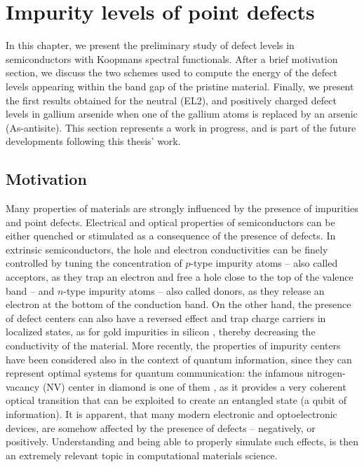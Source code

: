 \cleardoublepage
\chapter{Impurity levels of point defects\label{ch:defects}}
In this chapter, we present the preliminary study of defect levels in semiconductors with Koopmans spectral functionals. After a brief motivation section, we discuss the two schemes used to compute the energy of the defect levels appearing within the band gap of the pristine material. Finally, we present the first results obtained for the neutral (EL2), and positively charged defect levels in gallium arsenide when one of the gallium atoms is replaced by an arsenic (As-antisite). This section represents a work in progress, and is part of the future developments following this thesis' work.

\clearpage
\section{Motivation\label{sec:motivation-defects}}
Many properties of materials are strongly influenced by the presence of impurities and point defects. Electrical and optical properties of semiconductors can be either quenched or stimulated as a consequence of the presence of defects. In extrinsic semiconductors, the hole and electron conductivities can be finely controlled by tuning the concentration of $p$-type impurity atoms -- also called acceptors, as they trap an electron and free a hole close to the top of the valence band -- and $n$-type impurity atoms -- also called donors, as they release an electron at the bottom of the conduction band. On the other hand, the presence of defect centers can also have a reversed effect and trap charge carriers in localized states, as for gold impurities in silicon \cite{corsetti_negative-u_2014}, thereby decreasing the conductivity of the material. More recently, the properties of impurity centers have been considered also in the context of quantum information, since they can represent optimal systems for quantum communication: the infamous nitrogen-vacancy (NV) center in diamond is one of them \cite{maze_properties_2011}, as it provides a very coherent optical transition that can be exploited to create an entangled state (a qubit of information). It is apparent, that many modern electronic and optoelectronic devices, are somehow affected by the presence of defects -- negatively, or positively. Understanding and being able to properly simulate such effects, is then an extremely relevant topic in computational materials science.

